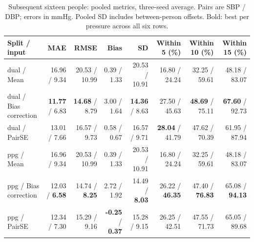 \begin{table}[t]
\centering\caption{Subsequent sixteen people: pooled metrics, three-seed average. Pairs are SBP / DBP; errors in mmHg. Pooled SD includes between-person offsets. Bold: best per pressure across all six rows.}\label{tab:previous_sixteen_pooled}
\footnotesize
\setlength{\tabcolsep}{4pt}
\begin{tabular}{lrrrrrrr}\toprule
Split / input & MAE & RMSE & Bias & SD & Within 5 (\%) & Within 10 (\%) & Within 15 (\%)\\\midrule
dual / Mean & 16.96 / 9.34 & 20.53 / 10.99 & 0.39 / 1.33 & 20.53 / 10.91 & 16.80 / 24.24 & 32.25 / 59.61 & 48.18 / 83.07\\
dual / Bias correction & \textbf{11.77} / 6.83 & \textbf{14.68} / 8.79 & 3.00 / 1.64 & \textbf{14.36} / 8.63 & 27.50 / 45.63 & \textbf{48.69} / 75.11 & \textbf{67.60} / 92.73\\
dual / PairSE & 13.01 / 7.66 & 16.57 / 9.73 & 0.58 / 0.67 & 16.57 / 9.71 & \textbf{28.04} / 41.79 & 47.62 / 70.39 & 61.95 / 87.94\\
ppg / Mean & 16.96 / 9.34 & 20.53 / 10.99 & 0.39 / 1.33 & 20.53 / 10.91 & 16.80 / 24.24 & 32.25 / 59.61 & 48.18 / 83.07\\
ppg / Bias correction & 12.03 / \textbf{6.58} & 14.74 / \textbf{8.25} & 2.72 / 1.92 & 14.49 / \textbf{8.03} & 26.22 / \textbf{46.35} & 47.40 / \textbf{76.83} & 65.08 / \textbf{94.13}\\
ppg / PairSE & 12.34 / 7.30 & 15.29 / 9.16 & \textbf{-0.25} / \textbf{0.37} & 15.28 / 9.15 & 26.25 / 42.51 & 47.55 / 71.73 & 65.05 / 89.68\\
\bottomrule\end{tabular}
\end{table}

